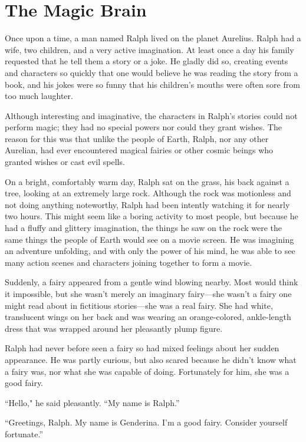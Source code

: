 \chapter{The Magic Brain}

Once upon a time, a man named Ralph lived on the planet Aurelius. Ralph had a wife, two children, and a very active imagination. At least once a day his family requested that he tell them a story or a joke. He gladly did so, creating events and characters so quickly that one would believe he was reading the story from a book, and his jokes were so funny that his children's mouths were often sore from too much laughter.

Although interesting and imaginative, the characters in Ralph's stories could not perform magic; they had no special powers nor could they grant wishes. The reason for this was that unlike the people of Earth, Ralph, nor any other Aurelian, had ever encountered magical fairies or other cosmic beings who granted wishes or cast evil spells.

\timesep

On a bright, comfortably warm day, Ralph sat on the grass, his back against a tree, looking at an extremely large rock. Although the rock was motionless and not doing anything noteworthy, Ralph had been intently watching it for nearly two hours. This might seem like a boring activity to most people, but because he had a fluffy and glittery imagination, the things he saw on the rock were the same things the people of Earth would see on a movie screen. He was imagining an adventure unfolding, and with only the power of his mind, he was able to see many action scenes and characters joining together to form a movie.

Suddenly, a fairy appeared from a gentle wind blowing nearby. Most would think it impossible, but she wasn't merely an imaginary fairy—she wasn't a fairy one might read about in fictitious stories—she was a real fairy. She had white, translucent wings on her back and was wearing an orange-colored, ankle-length dress that was wrapped around her pleasantly plump figure.

Ralph had never before seen a fairy so had mixed feelings about her sudden appearance. He was partly curious, but also scared because he didn't know what a fairy was, nor what she was capable of doing. Fortunately for him, she was a good fairy.

“Hello," he said pleasantly. “My name is Ralph.”

“Greetings, Ralph. My name is Genderina. I'm a good fairy. Consider yourself fortunate.”

